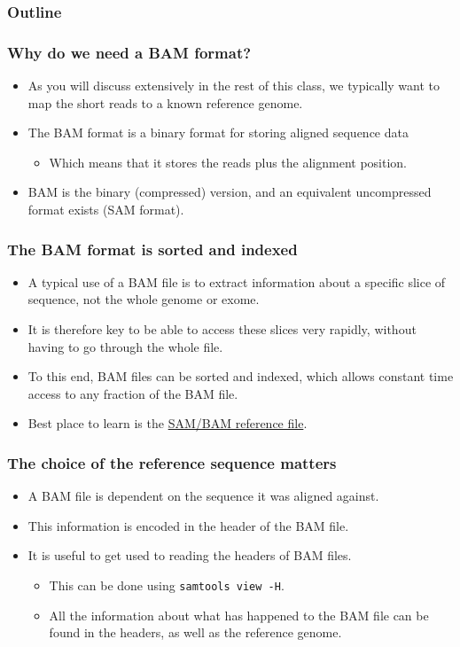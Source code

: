 \documentclass{beamer}
\begin{document}
 \begin{frame}
    \frametitle{Outline}
    \tableofcontents[currentsection]
  \end{frame}

\begin{frame}
  \frametitle{Why do we need a BAM format?}
  \begin{itemize}
  \item As you will discuss extensively in the rest of this class, we typically want to map the short reads to a known reference genome.
  \item The BAM format is a binary format for storing aligned sequence data
    \begin{itemize}
    \item Which means that it stores the reads plus the alignment position.
    \end{itemize}
  \item BAM is the binary (compressed) version, and an equivalent uncompressed format exists (SAM format).
  \end{itemize}
\end{frame}



\begin{frame}
  \frametitle{The BAM format is sorted and indexed}
  \begin{itemize}
  \item A typical use of a BAM file is to extract information about a specific slice of sequence, not the whole genome or exome.
  \item It is therefore key to be able to access these slices very rapidly, without having to go through the whole file.
  \item To this end, BAM files can be sorted and indexed, which allows constant time access to any fraction of the BAM file.
  \item Best place to learn is the \href{http://samtools.sourceforge.net/SAMv1.pdf}{SAM/BAM reference file}.
  \end{itemize}
\end{frame}


\begin{frame}
  \frametitle{The choice of the reference sequence matters}
  \begin{itemize}
  \item A BAM file is dependent on the sequence it was aligned against.
  \item This information is encoded in the header of the BAM file.
  \item It is useful to get used to reading the headers of BAM files.
    \begin{itemize}
    \item This can be done using \texttt{samtools view -H}.
    \item All the information about what has happened to the BAM file can be found in the headers, as well as the reference genome.
    \end{itemize}
  \end{itemize}
\end{frame}
\end{document}
